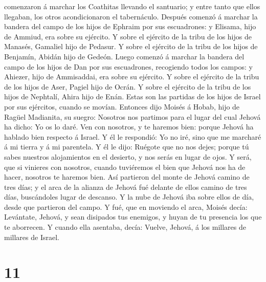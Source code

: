comenzaron á marchar los Coathitas llevando el santuario; y entre tanto
que ellos llegaban, los otros acondicionaron el tabernáculo.
 Después comenzó á marchar la bandera del campo de los
hijos de Ephraim por sus escuadrones: y Elisama, hijo de Ammiud, era
sobre su ejército.  Y sobre el ejército de la tribu de los
hijos de Manasés, Gamaliel hijo de Pedasur.  Y sobre el
ejército de la tribu de los hijos de Benjamín, Abidán hijo de Gedeón.
 Luego comenzó á marchar la bandera del campo de los hijos
de Dan por sus escuadrones, recogiendo todos los campos: y Ahiezer, hijo
de Ammisaddai, era sobre su ejército.  Y sobre el ejército
de la tribu de los hijos de Aser, Pagiel hijo de Ocrán.  Y
sobre el ejército de la tribu de los hijos de Nephtalí, Ahira hijo de
Enán.  Estas son las partidas de los hijos de Israel por
sus ejércitos, cuando se movían.  Entonces dijo Moisés á
Hobab, hijo de Ragüel Madianita, su suegro: Nosotros nos partimos para
el lugar del cual Jehová ha dicho: Yo os lo daré. Ven con nosotros, y te
haremos bien: porque Jehová ha hablado bien respecto á Israel.
 Y él le respondió: Yo no iré, sino que me marcharé á mi
tierra y á mi parentela.  Y él le dijo: Ruégote que no nos
dejes; porque tú sabes nuestros alojamientos en el desierto, y nos serás
en lugar de ojos.  Y será, que si vinieres con nosotros,
cuando tuviéremos el bien que Jehová nos ha de hacer, nosotros te
haremos bien.  Así partieron del monte de Jehová camino de
tres días; y el arca de la alianza de Jehová fué delante de ellos camino
de tres días, buscándoles lugar de descanso.  Y la nube de
Jehová iba sobre ellos de día, desde que partieron del campo.
 Y fué, que en moviendo el arca, Moisés decía: Levántate,
Jehová, y sean disipados tus enemigos, y huyan de tu presencia los que
te aborrecen.  Y cuando ella asentaba, decía: Vuelve,
Jehová, á los millares de millares de Israel.

\hypertarget{section-10}{%
\section{11}\label{section-10}}

